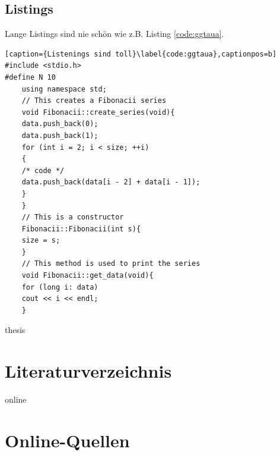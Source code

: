 \documentclass[11pt,a4paper]{report}
\begin{document}
\subsection{Listings}
Lange Listings sind nie schön wie z.B. Listing \ref{code:ggtaua}.
\begin{lstlisting}[caption={Listenings sind toll}\label{code:ggtaua},captionpos=b]
#include <stdio.h>
#define N 10
    using namespace std;
    // This creates a Fibonacii series
    void Fibonacii::create_series(void){
    data.push_back(0);
    data.push_back(1);
    for (int i = 2; i < size; ++i)
    {
    /* code */
    data.push_back(data[i - 2] + data[i - 1]);
    }
    }
    // This is a constructor
    Fibonacii::Fibonacii(int s){
    size = s;
    }
    // This method is used to print the series
    void Fibonacii::get_data(void){
    for (long i: data)
    cout << i << endl;
    }
\end{lstlisting}


\begin{btSect}{thesis} %
\section*{Literaturverzeichnis}
\btPrintCited
\end{btSect}
\begin{btSect}{online}
\section*{Online-Quellen}
\btPrintCited
\end{btSect}
\end{document}
